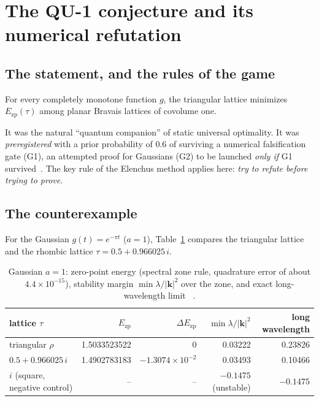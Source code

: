 \section{The QU-1 conjecture and its numerical refutation}\label{ch3:sec:qu1}

\subsection{The statement, and the rules of the game}
\begin{definition}[Conjecture QU-1]\label{ch3:def:qu1}
For every completely monotone function $g$, the triangular lattice minimizes $E_{\mathrm{zp}}(\tau)$ among planar
Bravais lattices of covolume one.
\end{definition}
\noindent It was the natural ``quantum companion'' of static universal optimality. It was
\emph{preregistered} with a prior probability of $0.6$ of surviving a numerical falsification gate (G1),
an attempted proof for Gaussians (G2) to be launched \emph{only if} G1 survived~\cite{ch3-p2zp}.
The key rule of the Elenchus method applies here: \emph{try to refute before trying to prove}.

\subsection{The counterexample \tierX}\label{ch3:sec:contreex}
For the Gaussian $g(t)=e^{-\pi t}$ ($a=1$), Table~\ref{ch3:tab:head} compares the triangular lattice and the rhombic
lattice $\tau=0.5+0.966025\,i$.
\begin{table}[ht]\centering\small
\caption{Gaussian $a=1$: zero-point energy (spectral zone rule, quadrature error of
about $4.4\times10^{-15}$), stability margin $\min\lambda/|\mathbf k|^2$ over the zone, and exact long-wavelength
limit \tierX~\cite{ch3-p2zp}.}\label{ch3:tab:head}
\begin{tabular}{lrrrr}\toprule
lattice $\tau$ & $E_{\mathrm{zp}}$ & $\Delta E_{\mathrm{zp}}$ & $\min\lambda/|\mathbf k|^2$ & long wavelength\\\midrule
triangular $\rho$ & 1.5033523522 & 0 & 0.03222 & 0.23826\\
$0.5+0.966025\,i$ & 1.4902783183 & $-1.3074\times10^{-2}$ & 0.03493 & 0.10466\\
$i$ (square, negative control) & -- & -- & $-0.1475$ (unstable) & $-0.1475$\\
\bottomrule\end{tabular}
\end{table}

